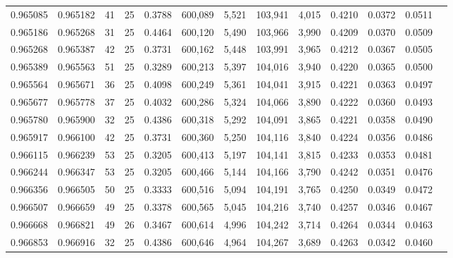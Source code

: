 \begin{tabular}{rrrrrrrrrrrrr}
0.965085 & 0.965182 &    41 &  25 &                                     0.3788 & 600,089 &   5,521 & 103,941 &   4,015 & 0.4210 & 0.0372 & 0.0511 \\
0.965186 & 0.965268 &    31 &  25 &                                     0.4464 & 600,120 &   5,490 & 103,966 &   3,990 & 0.4209 & 0.0370 & 0.0509 \\
0.965268 & 0.965387 &    42 &  25 &                                     0.3731 & 600,162 &   5,448 & 103,991 &   3,965 & 0.4212 & 0.0367 & 0.0505 \\
0.965389 & 0.965563 &    51 &  25 &                                     0.3289 & 600,213 &   5,397 & 104,016 &   3,940 & 0.4220 & 0.0365 & 0.0500 \\
0.965564 & 0.965671 &    36 &  25 &                                     0.4098 & 600,249 &   5,361 & 104,041 &   3,915 & 0.4221 & 0.0363 & 0.0497 \\
0.965677 & 0.965778 &    37 &  25 &                                     0.4032 & 600,286 &   5,324 & 104,066 &   3,890 & 0.4222 & 0.0360 & 0.0493 \\
0.965780 & 0.965900 &    32 &  25 &                                     0.4386 & 600,318 &   5,292 & 104,091 &   3,865 & 0.4221 & 0.0358 & 0.0490 \\
0.965917 & 0.966100 &    42 &  25 &                                     0.3731 & 600,360 &   5,250 & 104,116 &   3,840 & 0.4224 & 0.0356 & 0.0486 \\
0.966115 & 0.966239 &    53 &  25 &                                     0.3205 & 600,413 &   5,197 & 104,141 &   3,815 & 0.4233 & 0.0353 & 0.0481 \\
0.966244 & 0.966347 &    53 &  25 &                                     0.3205 & 600,466 &   5,144 & 104,166 &   3,790 & 0.4242 & 0.0351 & 0.0476 \\
0.966356 & 0.966505 &    50 &  25 &                                     0.3333 & 600,516 &   5,094 & 104,191 &   3,765 & 0.4250 & 0.0349 & 0.0472 \\
0.966507 & 0.966659 &    49 &  25 &                                     0.3378 & 600,565 &   5,045 & 104,216 &   3,740 & 0.4257 & 0.0346 & 0.0467 \\
0.966668 & 0.966821 &    49 &  26 &                                     0.3467 & 600,614 &   4,996 & 104,242 &   3,714 & 0.4264 & 0.0344 & 0.0463 \\
0.966853 & 0.966916 &    32 &  25 &                                     0.4386 & 600,646 &   4,964 & 104,267 &   3,689 & 0.4263 & 0.0342 & 0.0460 \\

\end{tabular}
